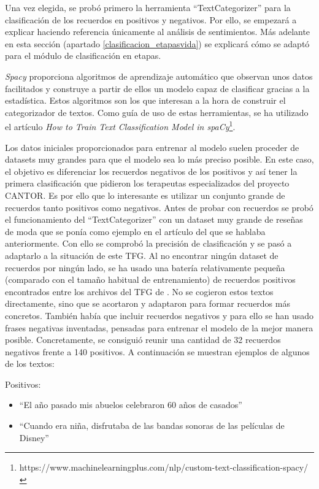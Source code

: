 Una vez elegida, se probó primero la herramienta ``TextCategorizer'' para la clasificación de los recuerdos en positivos y negativos. Por ello, se empezará a explicar haciendo referencia únicamente al análisis de sentimientos. Más adelante en esta sección (apartado \ref{clasificacion_etapasvida}) se explicará cómo se adaptó para el módulo de clasificación en etapas. 

\textit{Spacy} proporciona algoritmos de aprendizaje automático que observan unos datos facilitados y construye a partir de ellos un modelo capaz de clasificar gracias a la estadística. Estos algoritmos son los que interesan a la hora de construir el categorizador de textos. Como guía de uso de estas herramientas, se ha utilizado el artículo \textit{How to Train Text Classification Model in spaCy}\footnote{https://www.machinelearningplus.com/nlp/custom-text-classification-spacy/}.

Los datos iniciales proporcionados para entrenar al modelo suelen proceder de datasets muy grandes para que el modelo sea lo más preciso posible. En este caso, el objetivo es diferenciar los recuerdos negativos de los positivos y así tener la primera clasificación que pidieron los terapeutas especializados del proyecto CANTOR. Es por ello que lo interesante es utilizar un conjunto grande de recuerdos tanto positivos como negativos. Antes de probar con recuerdos se probó el funcionamiento del  ``TextCategorizer'' con un dataset muy grande de reseñas de moda que se ponía como ejemplo en el artículo del que se hablaba anteriormente. Con ello se comprobó la precisión de clasificación y se pasó a adaptarlo a la situación de este TFG. Al no encontrar ningún dataset de recuerdos por ningún lado, se ha usado una batería relativamente pequeña (comparado con el tamaño habitual de entrenamiento) de recuerdos positivos encontrados entre los archivos del TFG de \cite{lcastilla}. No se cogieron estos textos directamente, sino que se acortaron y adaptaron para formar recuerdos más concretos. También había que incluir recuerdos negativos y para ello se han usado frases negativas inventadas, pensadas para entrenar el modelo de la mejor manera posible. Concretamente, se consiguió reunir una cantidad de 32 recuerdos negativos frente a 140 positivos. A continuación se muestran ejemplos de algunos de los textos:

Positivos:
\begin{itemize}
	\item ``El año pasado mis abuelos celebraron 60 años de casados''
	\item ``Cuando era niña, disfrutaba de las bandas sonoras de las películas de Disney''
\end{itemize}

